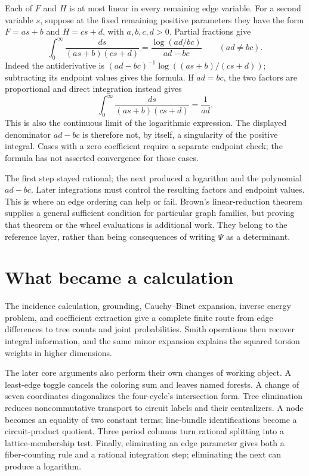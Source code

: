 \documentclass[11pt]{article}
\theoremstyle{definition}
\theoremstyle{remark}
\begin{document}
Each of $F$ and $H$ is at most linear in every remaining edge variable. For a second variable $s$, suppose at the fixed remaining positive parameters they have the form $F=as+b$ and $H=cs+d$, with $a,b,c,d>0$. Partial fractions give
\[
 \int_0^\infty\frac{ds}{(as+b)(cs+d)}
 =\frac{\log(ad/bc)}{ad-bc}\qquad(ad\ne bc).
\]
Indeed the antiderivative is
$(ad-bc)^{-1}\log((as+b)/(cs+d))$; subtracting its endpoint values gives the formula. If $ad=bc$, the two factors are proportional and direct integration instead gives
\[
 \int_0^\infty\frac{ds}{(as+b)(cs+d)}=\frac1{ad}.
\]
This is also the continuous limit of the logarithmic expression. The displayed denominator $ad-bc$ is therefore not, by itself, a singularity of the positive integral. Cases with a zero coefficient require a separate endpoint check; the formula has not asserted convergence for those cases.

The first step stayed rational; the next produced a logarithm and the polynomial $ad-bc$. Later integrations must control the resulting factors and endpoint values. This is where an edge ordering can help or fail. Brown's linear-reduction theorem supplies a general sufficient condition for particular graph families, but proving that theorem or the wheel evaluations is additional work. They belong to the reference layer, rather than being consequences of writing $\Psi$ as a determinant.

\section{What became a calculation}
\label{sec:conclusion}

The incidence calculation, grounding, Cauchy--Binet expansion, inverse energy problem, and coefficient extraction give a complete finite route from edge differences to tree counts and joint probabilities. Smith operations then recover integral information, and the same minor expansion explains the squared torsion weights in higher dimensions.

The later core arguments also perform their own changes of working object. A least-edge toggle cancels the coloring sum and leaves named forests. A change of seven coordinates diagonalizes the four-cycle's intersection form. Tree elimination reduces noncommutative transport to circuit labels and their centralizers. A node becomes an equality of two constant terms; line-bundle identifications become a circuit-product quotient. Three period columns turn rational splitting into a lattice-membership test. Finally, eliminating an edge parameter gives both a fiber-counting rule and a rational integration step; eliminating the next can produce a logarithm.
\end{document}
